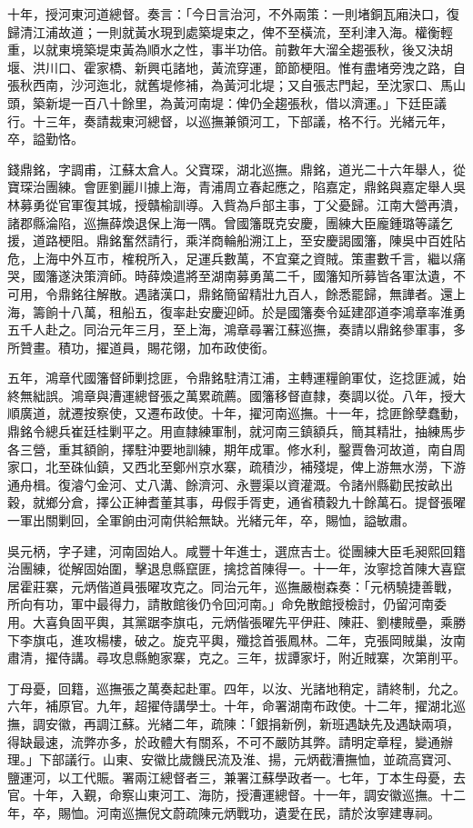 \begin{pinyinscope}
十年，授河東河道總督。奏言：「今日言治河，不外兩策：一則堵銅瓦廂決口，復歸清江浦故道；一則就黃水現到處築堤束之，俾不至橫流，至利津入海。權衡輕重，以就東境築堤束黃為順水之性，事半功倍。前數年大溜全趨張秋，後又決胡堰、洪川口、霍家橋、新興屯諸地，黃流穿運，節節梗阻。惟有盡堵旁洩之路，自張秋西南，沙河迤北，就舊堤修補，為黃河北堤；又自張志門起，至沈家口、馬山頭，築新堤一百八十餘里，為黃河南堤：俾仍全趨張秋，借以濟運。」下廷臣議行。十三年，奏請裁東河總督，以巡撫兼領河工，下部議，格不行。光緒元年，卒，謚勤恪。

錢鼎銘，字調甫，江蘇太倉人。父寶琛，湖北巡撫。鼎銘，道光二十六年舉人，從寶琛治團練。會匪劉麗川據上海，青浦周立春起應之，陷嘉定，鼎銘與嘉定舉人吳林募勇從官軍復其城，授贛榆訓導。入貲為戶部主事，丁父憂歸。江南大營再潰，諸郡縣淪陷，巡撫薛煥退保上海一隅。曾國籓既克安慶，團練大臣龐鍾璐等議乞援，道路梗阻。鼎銘奮然請行，乘洋商輪船溯江上，至安慶謁國籓，陳吳中百姓阽危，上海中外互市，榷稅所入，足運兵數萬，不宜棄之資賊。策畫數千言，繼以痛哭，國籓遂決策濟師。時薛煥遣將至湖南募勇萬二千，國籓知所募皆各軍汰遺，不可用，令鼎銘往解散。遇諸漢口，鼎銘簡留精壯九百人，餘悉罷歸，無譁者。還上海，籌餉十八萬，租船五，復率赴安慶迎師。於是國籓奏令延建邵道李鴻章率淮勇五千人赴之。同治元年三月，至上海，鴻章尋署江蘇巡撫，奏請以鼎銘參軍事，多所贊畫。積功，擢道員，賜花翎，加布政使銜。

五年，鴻章代國籓督師剿捻匪，令鼎銘駐清江浦，主轉運糧餉軍仗，迄捻匪滅，始終無絀誤。鴻章與漕運總督張之萬累疏薦。國籓移督直隸，奏調以從。八年，授大順廣道，就遷按察使，又遷布政使。十年，擢河南巡撫。十一年，捻匪餘孽蠢動，鼎銘令總兵崔廷桂剿平之。用直隸練軍制，就河南三鎮額兵，簡其精壯，抽練馬步各三營，重其額餉，擇駐沖要地訓練，期年成軍。修水利，鑿賈魯河故道，南自周家口，北至硃仙鎮，又西北至鄭州京水寨，疏積沙，補殘堤，俾上游無水澇，下游通舟楫。復濬勺金河、丈八溝、餘濟河、永豐渠以資灌溉。令諸州縣勸民按畝出穀，就鄉分倉，擇公正紳耆董其事，毋假手胥吏，通省積穀九十餘萬石。提督張曜一軍出關剿回，全軍餉由河南供給無缺。光緒元年，卒，賜恤，謚敏肅。

吳元柄，字子建，河南固始人。咸豐十年進士，選庶吉士。從團練大臣毛昶熙回籍治團練，從解固始圍，擊退息縣竄匪，擒捻首陳得一。十一年，汝寧捻首陳大喜竄居霍莊寨，元炳偕道員張曜攻克之。同治元年，巡撫嚴樹森奏：「元柄驍捷善戰，所向有功，軍中最得力，請散館後仍令回河南。」命免散館授檢討，仍留河南委用。大喜負固平輿，其黨踞李旗屯，元炳偕張曜先平伊莊、陳莊、劉樓賊壘，乘勝下李旗屯，進攻楊樓，破之。旋克平輿，殲捻首張鳳林。二年，克張岡賊巢，汝南肅清，擢侍講。尋攻息縣鮑家寨，克之。三年，拔譚家圩，附近賊寨，次第削平。

丁母憂，回籍，巡撫張之萬奏起赴軍。四年，以汝、光諸地稍定，請終制，允之。六年，補原官。九年，超擢侍講學士。十年，命署湖南布政使。十二年，擢湖北巡撫，調安徽，再調江蘇。光緒二年，疏陳：「銀捐新例，新班遇缺先及遇缺兩項，得缺最速，流弊亦多，於政體大有關系，不可不嚴防其弊。請明定章程，變通辦理。」下部議行。山東、安徽比歲饑民流及淮、揚，元炳截漕撫恤，並疏高寶河、鹽運河，以工代賑。署兩江總督者三，兼署江蘇學政者一。七年，丁本生母憂，去官。十年，入覲，命察山東河工、海防，授漕運總督。十一年，調安徽巡撫。十二年，卒，賜恤。河南巡撫倪文蔚疏陳元炳戰功，遺愛在民，請於汝寧建專祠。


\end{pinyinscope}

